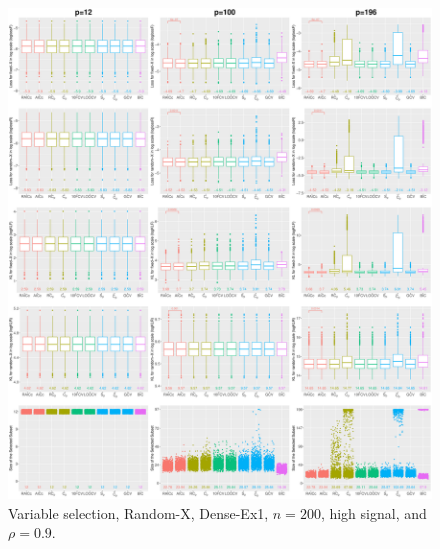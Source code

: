 \begin{figure}[!ht]
\centering
\includegraphics[width=\textwidth]{figures/supplement/randomx/subset_selection/Dense-Ex1_n200_hsnr_rho09.eps}
\caption{Variable selection, Random-X, Dense-Ex1, $n=200$, high signal, and $\rho=0.9$.}
\end{figure}
\clearpage
